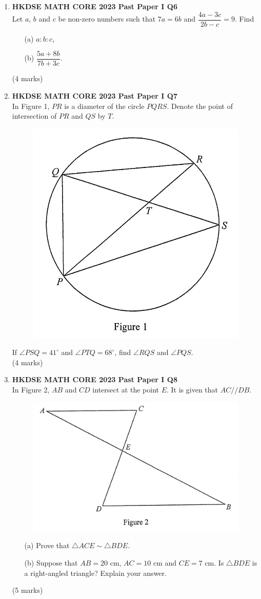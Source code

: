 \documentclass[12pt]{article}
\begin{document}
\begin{enumerate}
	\item \textbf{HKDSE MATH CORE 2023 Past Paper I Q6}\\
	Let $a$, $b$ and $c$ be non-zero numbers such that $7a = 6b$ and $\dfrac{4a - 3c}{2b - c} = 9$. Find
	\begin{enumerate}
		\item[(a)] $a : b : c$,
		\item[(b)] $\dfrac{5a + 8b}{7b + 3c}$.
	\end{enumerate}
	(4 marks)

	\item \textbf{HKDSE MATH CORE 2023 Past Paper I Q7}\\
	In Figure 1, $PR$ is a diameter of the circle $PQRS$. Denote the point of intersection of $PR$ and $QS$ by $T$.
	\begin{figure}[H]
		\centering
		\includegraphics[width = .3\linewidth]{2023Figure1.1}
	\end{figure}
	If $\angle PSQ = 41^\circ$ and $\angle PTQ = 68^\circ$, find $\angle RQS$ and $\angle PQS$. \\(4 marks)
	
	\item \textbf{HKDSE MATH CORE 2023 Past Paper I Q8}\\
	In Figure 2, $AB$ and $CD$ intersect at the point $E$. It is given that $AC // DB$.
	\begin{figure}[H]
		\centering
		\includegraphics[width = .3\linewidth]{2023Figure1.2}
	\end{figure}
	\begin{enumerate}
		\item[(a)] Prove that $\triangle ACE \sim \triangle BDE$.
		\item[(b)] Suppose that $AB = 20$ cm, $AC = 10$ cm and $CE = 7$ cm. Is $\triangle BDE$ is a right-angled triangle? Explain your answer.
	\end{enumerate}
	(5 marks)


\end{enumerate}
\end{document}
